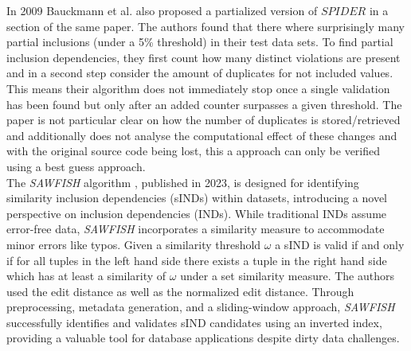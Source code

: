 In 2009 Bauckmann et al. also proposed a partialized version of $SPIDER$ in a section of the same paper. The authors found that there where surprisingly many partial inclusions (under a 5\% threshold) in their test data sets. To find partial inclusion dependencies, they first count how many distinct violations are present and in a second step consider the amount of duplicates for not included values. This means their algorithm does not immediately stop once a single validation has been found but only after an added counter surpasses a given threshold. The paper is not particular clear on how the number of duplicates is stored/retrieved and additionally does not analyse the computational effect of these changes and with the original source code being lost, this a approach can only be verified using a best guess approach.\\

The \textit{SAWFISH} algorithm \cite{kaminsky2023discovering}, published in 2023, is designed for identifying similarity inclusion dependencies (sINDs) within datasets, introducing a novel perspective on inclusion dependencies (INDs). While traditional INDs assume error-free data, \textit{SAWFISH} incorporates a similarity measure to accommodate minor errors like typos. Given a similarity threshold $\omega$ a sIND is valid if and only if for all tuples in the left hand side there exists a tuple in the right hand side which has at least a similarity of $\omega$ under a set similarity measure. The authors used the edit distance as well as the normalized edit distance. Through preprocessing, metadata generation, and a sliding-window approach, \textit{SAWFISH} successfully identifies and validates sIND candidates using an inverted index, providing a valuable tool for database applications despite dirty data challenges. \\

